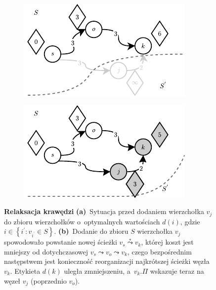 \begin{figure}[!htbp]
	\centering
	\null\hfill
	\begin{subfigure}[b]{0.46\textwidth}
		\includegraphics[width=\textwidth]{Chapter_I/RELAX-EDGES-Example/a.pdf}
		\caption{}
		\label{fig:relaxEdges:a}
	\end{subfigure}%
	\hfill
	\begin{subfigure}[b]{0.46\textwidth}
		\includegraphics[width=\textwidth]{Chapter_I/RELAX-EDGES-Example/b.pdf}
		\caption{}
		\label{fig:relaxEdges:b}
	\end{subfigure}
	\hfill\null
	\caption{
		\textbf{Relaksacja krawędzi}
		\textbf{(a)}~Sytuacja przed dodaniem wierzchołka $v_{j}$ do zbioru wierzchołków o~optymalnych wartościach $d \left( i \right)$, gdzie $i \in \left\{ i^{'} : v_{i^{'}} \in S \right\}$.
		\textbf{(b)}~Dodanie do zbioru $S$ wierzchołka $v_{j}$ spowodowało powstanie nowej ścieżki $v_{s} \overset{*}\leadsto v_{k}$, której koszt jest mniejszy od dotychczasowej $v_{s} \leadsto v_{o} \leadsto v_{k}$, czego bezpośrednim następstwem jest konieczność reorganizacji najkrótszej ścieżki węzła $v_{k}$.
		Etykieta $d \left( k \right)$ uległa zmniejszeniu, a~$v_{k}.\Pi$ wskazuje teraz na węzeł $v_{j}$ (poprzednio $v_{o}$).
	}
	\label{fig:relaxEdges}
\end{figure}

